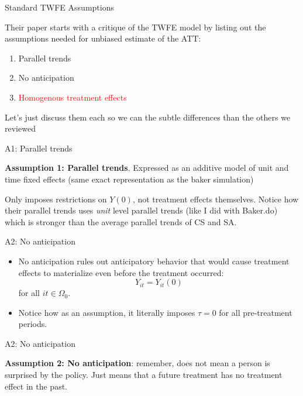 \documentclass{beamer}
\begin{document}
\begin{frame}{Standard TWFE Assumptions}

Their paper starts with a critique of the TWFE model by listing out the assumptions needed for unbiased estimate of the ATT:

\begin{enumerate}
\item Parallel trends 
\item No anticipation
\item \textcolor{red}{Homogenous treatment effects}
\end{enumerate}

Let's just discuss them each so we can the subtle differences than the others we reviewed

\end{frame}

\begin{frame}{A1: Parallel trends}

\textbf{Assumption 1: Parallel trends}. Expressed as an additive model of unit and time fixed effects (same exact representation as the baker simulation)

Only imposes restrictions on $Y(0)$, not treatment effects themselves. Notice how their parallel trends uses \emph{unit} level parallel trends (like I did with Baker.do) which is stronger than the average parallel trends of CS and SA.

\end{frame}

\begin{frame}{A2: No anticipation}

\begin{itemize}
\item No anticipation rules out anticipatory behavior that would cause treatment effects to materialize even before the treatment occurred:$$Y_{it} = Y_{it}(0)$$ for all $it \in \Omega_0$. 
\item Notice how as an assumption, it literally imposes $\tau=0$ for all pre-treatment periods. 

\end{itemize}

\end{frame}

\begin{frame}{A2: No anticipation}


\textbf{Assumption 2: No anticipation}: remember, does not mean a person is surprised by the policy.  Just means that a future treatment has no treatment effect in the past. 

\end{frame}
\end{document}
